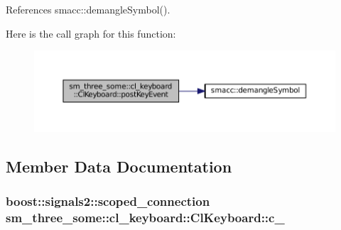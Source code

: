 References smacc\+::demangle\+Symbol().




Here is the call graph for this function\+:
\nopagebreak
\begin{figure}[H]
\begin{center}
\leavevmode
\includegraphics[width=350pt]{classsm__three__some_1_1cl__keyboard_1_1ClKeyboard_acc062fa92e9d5e05a9690ad36cfc156e_cgraph}
\end{center}
\end{figure}




\subsection{Member Data Documentation}
\subsubsection[{\texorpdfstring{c\+\_\+}{c_}}]{\setlength{\rightskip}{0pt plus 5cm}boost\+::signals2\+::scoped\+\_\+connection sm\+\_\+three\+\_\+some\+::cl\+\_\+keyboard\+::\+Cl\+Keyboard\+::c\+\_\+}\hypertarget{classsm__three__some_1_1cl__keyboard_1_1ClKeyboard_ab56d189c1d117cc0d3d57595b9bf76a9}{}\label{classsm__three__some_1_1cl__keyboard_1_1ClKeyboard_ab56d189c1d117cc0d3d57595b9bf76a9}


